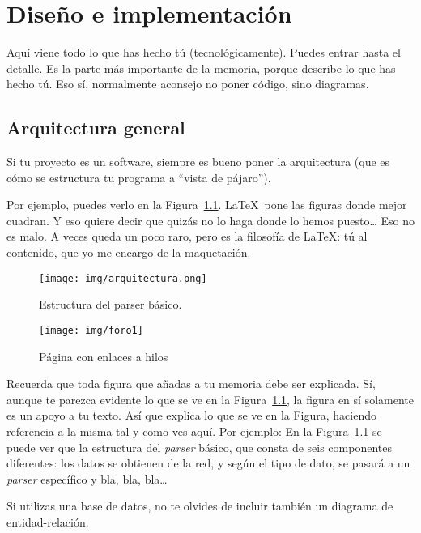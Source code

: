 \documentclass[a4paper, 12pt]{book}
\begin{document}
\chapter{Diseño e implementación}
\label{chap:diseño}


Aquí viene todo lo que has hecho tú (tecnológicamente). 
Puedes entrar hasta el detalle. 
Es la parte más importante de la memoria, porque describe lo que has hecho tú.
Eso sí, normalmente aconsejo no poner código, sino diagramas.

\section{Arquitectura general} 
\label{sec:arquitectura}

Si tu proyecto es un software, siempre es bueno poner la arquitectura (que es cómo se estructura tu programa a ``vista de pájaro'').

Por ejemplo, puedes verlo en la Figura~\ref{fig:arquitectura}.
\LaTeX \ pone las figuras donde mejor cuadran. 
Y eso quiere decir que quizás no lo haga donde lo hemos puesto\ldots
Eso no es malo.
A veces queda un poco raro, pero es la filosofía de \LaTeX: tú al contenido, que yo me encargo de la maquetación.

\begin{figure}
  \centering
  \texttt{[image: img/arquitectura.png]}
  \caption{Estructura del parser básico.}\label{fig:arquitectura}
\end{figure}

\begin{figure}
    \centering
    \texttt{[image: img/foro1]}
    \caption{Página con enlaces a hilos}\label{fig:_arquitectura}
\end{figure}

 
Recuerda que toda figura que añadas a tu memoria debe ser explicada.
Sí, aunque te parezca evidente lo que se ve en la Figura~\ref{fig:arquitectura}, la figura en sí solamente es un apoyo a tu texto.
Así que explica lo que se ve en la Figura, haciendo referencia a la misma tal y como ves aquí.
Por ejemplo: En la Figura~\ref{fig:arquitectura} se puede ver que la estructura del \emph{parser} básico, que consta de seis componentes diferentes: los datos se obtienen de la red, y según el tipo de dato, se pasará a un \emph{parser} específico y bla, bla, bla\ldots

Si utilizas una base de datos, no te olvides de incluir también un diagrama de entidad-relación.
\end{document}
